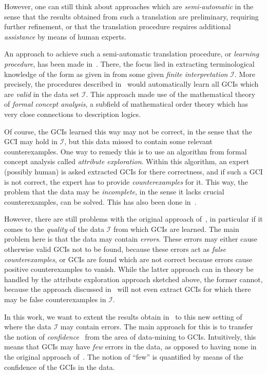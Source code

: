 However, one can still think about approaches which are \emph{semi-automatic} in the sense
that the results obtained from such a translation are preliminary, requiring further
refinement, or that the translation procedure requires additional \emph{assistance} by
means of human experts.

An approach to achieve such a semi-automatic translation procedure, or \emph{learning
  procedure}, has been made in~\cite{Diss-Felix}.  There, the focus lied in extracting
terminological knowledge of the form as given in  from some given \emph{finite
  interpretation} $\mathcal{I}$.  More precisely, the procedures described
in~\cite{Diss-Felix} would automatically learn all GCIs which are \emph{valid} in the data
set $\mathcal{I}$.  This approach made use of the mathematical theory of \emph{formal
  concept analysis}, a subfield of mathematical order theory which has very close
connections to description logics.

Of course, the GCIs learned this way may not be correct, in the sense that the GCI may
hold in $\mathcal{I}$, but this data missed to contain some relevant counterexamples.  One
way to remedy this is to use an algorithm from formal concept analysis called
\emph{attribute exploration}.  Within this algorithm, an expert (possibly human) is asked
extracted GCIs for there correctness, and if such a GCI is not correct, the expert has to
provide \emph{counterexamples} for it.  This way, the problem that the data may be
\emph{incomplete}, in the sense it lacks crucial counterexamples, can be solved.  This has
also been done in~\cite{Diss-Felix}.

However, there are still problems with the original approach of~\cite{Diss-Felix}, in
particular if it comes to the \emph{quality} of the data $\mathcal{I}$ from which GCIs are
learned.  The main problem here is that the data may contain \emph{errors}.  These errors
may either cause otherwise valid GCIs not to be found, because these errors act as
\emph{false counterexamples}, or GCIs are found which are not correct because errors cause
positive counterexamples to vanish.  While the latter approach can in theory be handled by
the attribute exploration approach sketched above, the former cannot, because the approach
discussed in~\cite{Diss-Felix} will not even extract GCIs for which there may be false
counterexamples in $\mathcal{I}$.

In this work, we want to extent the results obtain in~\cite{Diss-Felix} to this new
setting of where the data $\mathcal{I}$ may contain errors.  The main approach for this is
to transfer the notion of \emph{confidence}~\cite{arules:agrawal:association-rules} from
the area of data-mining to GCIs.  Intuitively, this means that GCIs may have \emph{few}
errors in the data, as opposed to having none in the original approach
of~\cite{Diss-Felix}.  The notion of ``few'' is quantified by means of the confidence of
the GCIs in the data.

